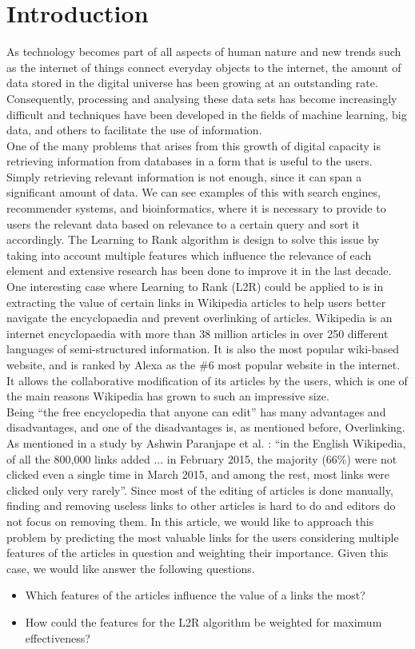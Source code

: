 \section{Introduction}

As technology becomes part of all aspects of human nature and new trends such as the internet of things connect everyday objects to the internet, the amount of data stored in the digital universe has been growing at an outstanding rate. Consequently, processing and analysing these data sets has become increasingly difficult and techniques have been developed in the fields of machine learning, big data, and others to facilitate the use of information. \\
One of the many problems that arises from this growth of digital capacity is retrieving information from databases in a form that is useful to the users. Simply retrieving relevant information is not enough, since it can span a significant amount of data. We can see examples of this with search engines, recommender systems, and bioinformatics, where it is necessary to provide to users the relevant data based on relevance to a certain query and sort it accordingly. The Learning to Rank algorithm is design to solve this issue by taking into account multiple features which influence the relevance of each element and extensive research has been done to improve it in the last decade. \\
One interesting case where Learning to Rank (L2R) could be applied to is in extracting the value of certain links in Wikipedia articles to help users better navigate the encyclopaedia and prevent overlinking of articles. Wikipedia is an internet encyclopaedia with more than 38 million articles in over 250 different languages of semi-structured information. It is also the most popular wiki-based website, and is ranked by Alexa as the \#6 most popular website in the internet. It allows the collaborative modification of its articles by the users, which is one of the main reasons Wikipedia has grown to such an impressive size. \\
Being ``the free encyclopedia that anyone can edit'' has many advantages and disadvantages, and one of the disadvantages is, as mentioned before, Overlinking. As mentioned in a study by Ashwin Paranjape et al. \cite{paranjape}:  ``in the English Wikipedia, of all the 800,000 links added ... in February 2015, the majority (66\%) were not clicked even a single time in March 2015, and among the rest, most links were clicked only very rarely''. Since most of the editing of articles is done manually, finding and removing useless links to other articles is hard to do and editors do not focus on removing them. In this article, we would like to approach this problem by predicting the most valuable links for the users considering multiple features of the articles in question and weighting their importance. Given this case, we would like answer the following questions.
\begin{itemize}
\item Which features of the articles influence the value of a links the most?
\item How could the features for the L2R algorithm be weighted for maximum effectiveness?
\end{itemize}
